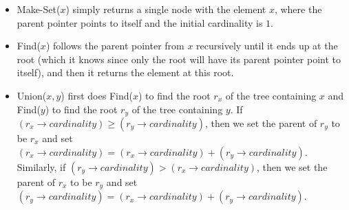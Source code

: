 \documentclass[11pt]{article}
\begin{document}
\begin{itemize}
\item Make-Set($x$) simply returns a single node with the element $x$, where the parent pointer points to itself and the initial cardinality is $1$.

\item Find($x$) follows the parent pointer from $x$ recursively until it ends up at the root (which it knows since only the root will have 
its parent pointer point to itself), and then it returns the element at this root.

\item Union($x,y$) first does Find($x$) to find the root $r_x$ of the tree containing $x$ and Find($y$) to find the root $r_y$ of the tree containing $y$. 
If $(r_x \rightarrow cardinality) \geq (r_y \rightarrow cardinality)$, then we set the parent of $r_y$ to be $r_x$ and 
set $(r_x \rightarrow cardinality) = (r_x \rightarrow cardinality) + (r_y \rightarrow cardinality)$. 
Similarly, if $(r_y \rightarrow cardinality) > (r_x \rightarrow cardinality)$, then we set the parent of $r_x$ to be $r_y$ and 
set $(r_y \rightarrow cardinality) = (r_x \rightarrow cardinality) + (r_y \rightarrow cardinality)$.
\end{itemize}
\end{document}
